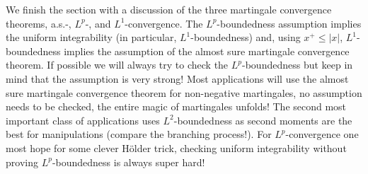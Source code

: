 
We finish the section with a discussion of the three martingale convergence theorems, a.s.-, $L^p$-, and $L^1$-convergence. The $L^p$-boundedness assumption implies the uniform integrability (in particular, $L^1$-boundedness) and, using $x^+\leq |x|$, $L^1$-boundedness implies the assumption of the almost sure martingale convergence theorem. If possible we will always try to check the $L^p$-boundedness but keep in mind that the assumption is very strong! Most applications will use the almost sure martingale convergence theorem for non-negative martingales, no assumption needs to be checked, the entire magic of martingales unfolds! The second most important class of applications uses $L^2$-boundedness as second moments are the best for manipulations (compare the branching process!). For $L^p$-convergence one most hope for some clever H\"older trick, checking uniform integrability without proving $L^p$-boundedness is always super hard!\smallskip

